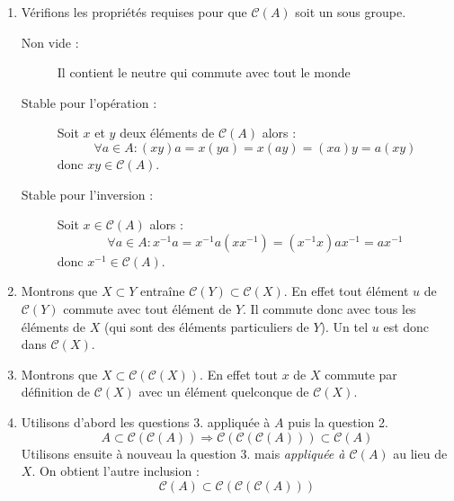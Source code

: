 \begin{enumerate}
 \item Vérifions les propriétés requises pour que $\mathcal C (A)$ soit un sous groupe.
\begin{description}
 \item[Non vide :] Il contient le neutre qui commute avec tout le monde
\item [Stable pour l'opération :] Soit $x$ et $y$ deux éléments de $\mathcal C (A)$ alors :
\begin{displaymath}
 \forall a\in A : (xy)a = x(ya) = x(ay) = (xa)y = a(xy)
\end{displaymath}
donc $xy\in \mathcal C (A)$.
\item[Stable pour l'inversion :] Soit $x \in \mathcal C (A)$ alors :
\begin{displaymath}
 \forall a\in A : x^{-1}a = x^{-1}a(xx^{-1})= (x^{-1}x)ax^{-1} = ax^{-1}
\end{displaymath}
donc $x^{-1}\in \mathcal C (A)$.
 \end{description}
\item Montrons que $X\subset Y$ entraîne $\mathcal C (Y) \subset \mathcal C (X)$.
En effet tout élément $u$ de $\mathcal C (Y)$ commute avec tout élément de $Y$. Il commute donc avec tous les éléments de $X$ (qui sont des éléments particuliers de $Y$). Un tel $u$ est donc dans $\mathcal C (X)$.
\item Montrons que $X \subset \mathcal C (\mathcal C (X))$.
En effet tout $x$ de $X$ commute par définition de $\mathcal C (X)$ avec un élément quelconque de $\mathcal C (X)$.
\item Utilisons d'abord les questions 3. appliquée à $A$ puis la question 2.
\begin{displaymath}
 A \subset \mathcal C (\mathcal C (A)) \Rightarrow \mathcal C (\mathcal C (\mathcal C (A))) \subset \mathcal C (A)
\end{displaymath}
Utilisons ensuite à nouveau la question 3. mais \emph{appliquée à $\mathcal C (A)$} au lieu de $X$. On obtient l'autre inclusion :
\begin{displaymath}
 \mathcal C (A) \subset \mathcal C (\mathcal C (\mathcal C (A))) 
\end{displaymath}
\end{enumerate}
